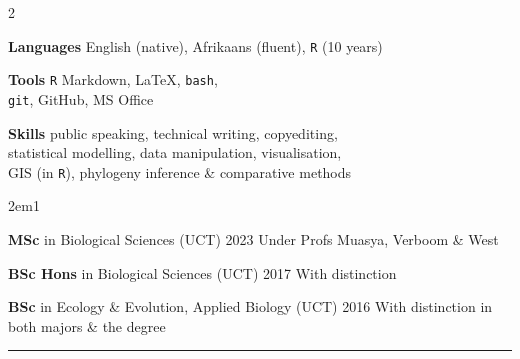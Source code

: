 \documentclass[10pt]{article}
\begin{document}


\begin{multicols}{2} %

\textbf{Languages}
  \hfill
    English {\small (native)},
    Afrikaans {\small (fluent)},
    \texttt{R} {\small (10 years)}

\textbf{Tools}
  \hfill \texttt{R} Markdown, {\selectfont \LaTeX}, \texttt{bash}, \\
  \hfill \texttt{git}, GitHub, MS Office

\textbf{Skills} {\small
  \hfill public speaking, technical writing, copyediting, \\
  \hfill statistical modelling, data manipulation, visualisation, \\
  \hfill GIS (in \texttt{R}), phylogeny inference \& comparative methods}

\columnbreak

\begin{hangparas}{2em}{1}

  \textbf{MSc} in Biological Sciences (UCT)                     \hfill 2023 \break
  Under Profs Muasya, Verboom \& West
  
  \textbf{BSc Hons} in Biological Sciences (UCT)                \hfill 2017 \break
  With distinction
  
  \textbf{BSc} in Ecology \& Evolution, Applied Biology (UCT)   \hfill 2016 \break
  With distinction in both majors \& the degree
  
\end{hangparas}

\end{multicols} %

\hrule

\

\vskip5pt
\end{document}
